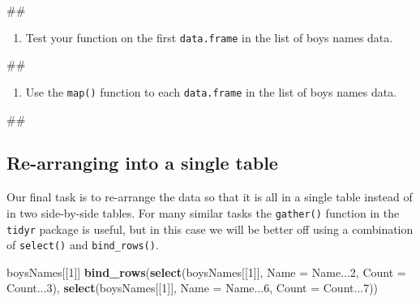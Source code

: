 \documentclass[]{book}
\newenvironment{Shaded}{\begin{snugshade}}{\end{snugshade}}
\newcommand{\KeywordTok}[1]{\textcolor[rgb]{0.13,0.29,0.53}{\textbf{#1}}}
\newcommand{\DataTypeTok}[1]{\textcolor[rgb]{0.13,0.29,0.53}{#1}}
\newcommand{\DecValTok}[1]{\textcolor[rgb]{0.00,0.00,0.81}{#1}}
\newcommand{\NormalTok}[1]{#1}
\providecommand{\tightlist}{%
  \setlength{\itemsep}{0pt}\setlength{\parskip}{0pt}}
\begin{document}
\begin{Shaded}
\begin{Highlighting}[]
\NormalTok{## }
\end{Highlighting}
\end{Shaded}

\begin{enumerate}
\def\labelenumi{\arabic{enumi}.}
\setcounter{enumi}{1}
\tightlist
\item
  Test your function on the first \texttt{data.frame} in the list of
  boys names data.
\end{enumerate}

\begin{Shaded}
\begin{Highlighting}[]
\NormalTok{## }
\end{Highlighting}
\end{Shaded}

\begin{enumerate}
\def\labelenumi{\arabic{enumi}.}
\setcounter{enumi}{2}
\tightlist
\item
  Use the \texttt{map()} function to each \texttt{data.frame} in the
  list of boys names data.
\end{enumerate}

\begin{Shaded}
\begin{Highlighting}[]
\NormalTok{## }
\end{Highlighting}
\end{Shaded}

\subsection{Re-arranging into a single
table}\label{re-arranging-into-a-single-table}

Our final task is to re-arrange the data so that it is all in a single
table instead of in two side-by-side tables. For many similar tasks the
\texttt{gather()} function in the \texttt{tidyr} package is useful, but
in this case we will be better off using a combination of
\texttt{select()} and \texttt{bind\_rows()}.

\begin{Shaded}
\begin{Highlighting}[]
\NormalTok{boysNames[[}\DecValTok{1}\NormalTok{]]}
\KeywordTok{bind_rows}\NormalTok{(}\KeywordTok{select}\NormalTok{(boysNames[[}\DecValTok{1}\NormalTok{]], }\DataTypeTok{Name =}\NormalTok{ Name...}\DecValTok{2}\NormalTok{, }\DataTypeTok{Count =}\NormalTok{ Count...}\DecValTok{3}\NormalTok{),}
          \KeywordTok{select}\NormalTok{(boysNames[[}\DecValTok{1}\NormalTok{]], }\DataTypeTok{Name =}\NormalTok{ Name...}\DecValTok{6}\NormalTok{, }\DataTypeTok{Count =}\NormalTok{ Count...}\DecValTok{7}\NormalTok{))}
\end{Highlighting}
\end{Shaded}
\end{document}
